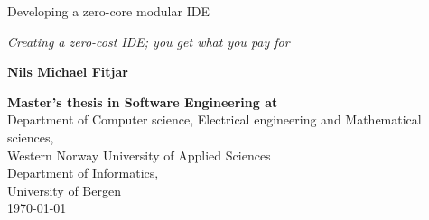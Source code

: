 
\begin{titlepage} %
  \selectfont
  \centering %


  \vspace{200pt}
  {\Huge Developing a zero-core modular IDE} \\ %
  \vspace{5pt}

  {\Large \textsl{Creating a zero-cost IDE; you get what you pay for}} %
  \vspace{50pt}


  \LARGE{\textbf{Nils Michael Fitjar}}\\ %

  \vfill %



  {\Large \textbf{Master's thesis in Software Engineering at} \\
  \vspace{10pt}
  Department of Computer science, Electrical engineering and Mathematical sciences, \\
  Western Norway University of Applied Sciences \\
  \vspace{10pt}
  Department of  Informatics, \\
  University of Bergen \\}
  \vspace{10pt}
  {\large \monthyeardate\today} %


\end{titlepage}
